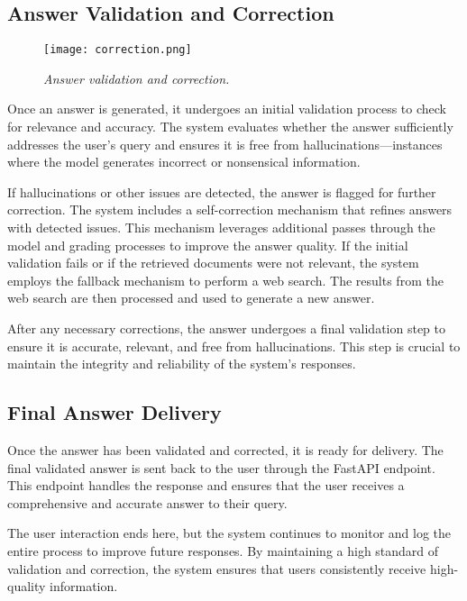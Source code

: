 \subsection{Answer Validation and Correction}

\begin{figure}[H]
    \centering
    \texttt{[image: correction.png]}
    \caption{
        \it{Answer validation and correction.}
    }
\end{figure}

Once an answer is generated, it undergoes an initial validation process to check for relevance and accuracy. The system evaluates whether the answer sufficiently addresses the user's query and ensures it is free from hallucinations—instances where the model generates incorrect or nonsensical information.

If hallucinations or other issues are detected, the answer is flagged for further correction. The system includes a self-correction mechanism that refines answers with detected issues. This mechanism leverages additional passes through the model and grading processes to improve the answer quality. If the initial validation fails or if the retrieved documents were not relevant, the system employs the fallback mechanism to perform a web search. The results from the web search are then processed and used to generate a new answer.

After any necessary corrections, the answer undergoes a final validation step to ensure it is accurate, relevant, and free from hallucinations. This step is crucial to maintain the integrity and reliability of the system's responses.

\subsection{Final Answer Delivery}

Once the answer has been validated and corrected, it is ready for delivery. The final validated answer is sent back to the user through the FastAPI endpoint. This endpoint handles the response and ensures that the user receives a comprehensive and accurate answer to their query.

The user interaction ends here, but the system continues to monitor and log the entire process to improve future responses. By maintaining a high standard of validation and correction, the system ensures that users consistently receive high-quality information.

